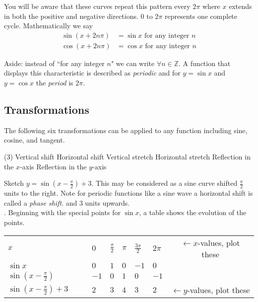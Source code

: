You will be aware that these curves repeat this pattern every $2 \pi $ where $x$ extends in both the positive and negative directions. $0$ to $2\pi $ represents one complete cycle. Mathematically we say
\begin{align*}\sin  \left (x +2 n \pi \right ) &  = \sin  x\text{\  for any integer }n \\
	\cos  \left (x +2 n \pi \right ) &  = \cos  x\text{\  for any integer }n\end{align*}

Aside: instead of ``for any integer $n$" we can write $ \forall n \in \mathbb{Z}$. A function that displays this characteristic is described as \emph{periodic} and for $y =\sin x$ and $y =\cos x$ the \emph{period} is $2 \pi $. 

\subsection*{Transformations}
The following six transformations can be applied to any function including sine, cosine, and tangent. 
\begin{tasks}[style=itemize](3)
\task Vertical shift 
\task Horizontal shift 
\task Vertical stretch 
\task Horizontal stretch 
\task Reflection in the $x$-axis 
\task Reflection in the $y$-axis 
\end{tasks}

\example Sketch $y =\sin  \left (x -\frac{\pi }{2}\right ) +3$. This may be considered as a sine curve shifted $\frac{\pi }{2}$ units to the right. Note for periodic functions like a sine wave a horizontal shift is called a \textit{phase shift}. and $3$ units upwards.\\ 
. Beginning with the special points for $\sin x$, a table shows the evolution of the points. \\
\begin{tabular}{llllllc}\cmidrule{1-6}
	$x$  & $0$  & $\frac{\pi }{2}$  & $\pi $  & $\frac{3 \pi }{2}$  & $2 \pi $ & $\leftarrow x$-values, plot these \\
	\cmidrule{1-6}
	$\sin  x$  & $0$  & $1$  & $0$  & $ -1$  & $0$ & \\
	\cmidrule{1-6}
	$\sin  \left (x -\frac{\pi }{2}\right )$  & $ -1$  & $0$  & $1$  & $0$  & $ -1$&  \\
	\cmidrule{1-6}
	$\sin  \left (x -\frac{\pi }{2}\right ) +3\qquad$  & $2$  & $3$  & $4$  & $3$  & $2$&$\leftarrow y$-values, plot these  \\
	\cmidrule{1-6}
\end{tabular}

